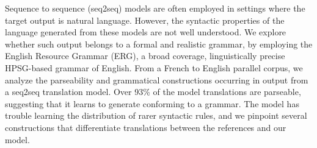 Sequence to sequence (seq2seq) models are often employed in settings where the target output is natural language. However, the syntactic properties of the language generated from these models are not well understood. We explore whether such output belongs to a formal and realistic grammar, by employing the English Resource Grammar (ERG), a broad coverage, linguistically precise HPSG-based grammar of English. From a French to English parallel corpus, we analyze the parseability and grammatical constructions occurring in output from a seq2seq translation model.  Over 93\% of the model translations are parseable, suggesting that it learns to generate conforming to a grammar. The model has trouble learning the distribution of rarer syntactic rules, and we pinpoint several constructions that differentiate translations between the references and our model.
